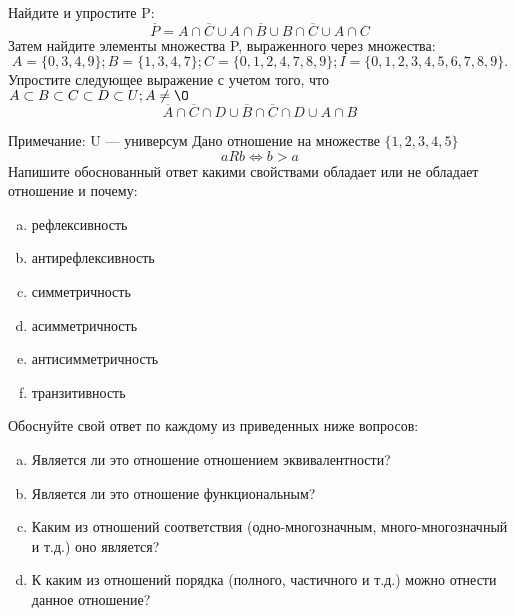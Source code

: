 \documentclass[10pt]{exam}
\begin{document}
\begin{questions}
\question
Найдите и упростите P:
\begin{equation*}
\overline{P} = A \cap \overline{C} \cup A \cap \overline{B} \cup B \cap \overline{C} \cup A \cap C
\end{equation*}
Затем найдите элементы множества P, выраженного через множества:
\begin{equation*}
A = \{0, 3, 4, 9\}; 
B = \{1, 3, 4, 7\};
C = \{0, 1, 2, 4, 7, 8, 9\};
I = \{0, 1, 2, 3, 4, 5, 6, 7, 8, 9\}.
\end{equation*}\question
Упростите следующее выражение с учетом того, что $A\subset B \subset C \subset D \subset U; A \neq \O$
\begin{equation*}
\overline{A} \cap \overline{C} \cap D \cup \overline{B} \cap \overline{C} \cap D \cup A \cap B
\end{equation*}

Примечание: U — универсум\question
Дано отношение на множестве $\{1, 2, 3, 4, 5\}$ 
\begin{equation*}
aRb \iff b > a
\end{equation*}
Напишите обоснованный ответ какими свойствами обладает или не обладает отношение и почему:   
\begin{enumerate} [a)]\setcounter{enumi}{0}
\item рефлексивность
\item антирефлексивность
\item симметричность
\item асимметричность
\item антисимметричность
\item транзитивность
\end{enumerate}

Обоснуйте свой ответ по каждому из приведенных ниже вопросов:
\begin{enumerate} [a)]\setcounter{enumi}{0}
    \item Является ли это отношение отношением эквивалентности?
    \item Является ли это отношение функциональным?
    \item Каким из отношений соответствия (одно-многозначным, много-многозначный и т.д.) оно является?
    \item К каким из отношений порядка (полного, частичного и т.д.) можно отнести данное отношение?
\end{enumerate}


\end{questions}
\end{document}
